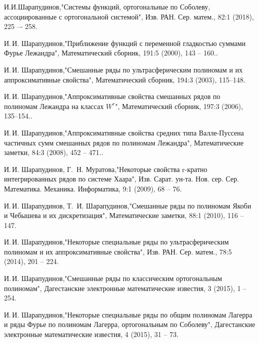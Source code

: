 \begin{thebibliography}{20}
	
И.И.Шарапудинов,"Системы функций, ортогональные по Соболеву, ассоциированные с ортогональной системой", Изв. РАН. Сер. матем., 82:1 (2018), 225 –- 258.



И.\,И. Шарапудинов,"Приближение функций с переменной гладкостью суммами Фурье Лежандра", Математический сборник, 191:5 (2000), 143 -- 160..



И.\,И. Шарапудинов,"Смешанные ряды по ультрасферическим полиномам и их аппроксимативные свойства", Математический сборник, 194:3 (2003), 115--148.



И.\,И. Шарапудинов,"Аппроксимативные свойства смешанных рядов по полиномам Лежандра на классах $W^r$", Математический сборник, 197:3 (2006), 135–154..



И.\,И. Шарапудинов,"Аппроксимативные свойства средних типа Валле-Пуссена частичных сумм смешанных рядов по полиномам Лежандра", Математические заметки, 84:3 (2008), 452 -- 471..



И.\,И. Шарапудинов,  Г.\, Н. Муратова,"Некоторые свойства r-кратно интегрированных рядов по системе Хаара", Изв. Сарат. ун-та. Нов. сер. Сер. Математика. Механика. Информатика, 9:1 (2009), 68 -- 76.



И.\,И. Шарапудинов, Т.\, И. Шарапудинов,"Смешанные ряды по полиномам Якоби и Чебышева и их дискретизация", Математические заметки, 88:1 (2010), 116 -- 147.



И.\,И. Шарапудинов,"Некоторые специальные ряды по ультрасферическим полиномам и их аппроксимативные свойства", Изв. РАН. Сер. матем., 78:5 (2014), 201 -- 224.



И.\,И. Шарапудинов,"Смешанные ряды по классическим ортогональным полиномам", Дагестанские электронные математические известия, 3 (2015), 1 -- 254.



И.\,И. Шарапудинов,"Некоторые специальные ряды по общим полиномам Лагерра и ряды Фурье по полиномам Лагерра, ортогональным по Соболеву", Дагестанские электронные математические известия, 4 (2015), 31 -- 73.




\end{thebibliography}
